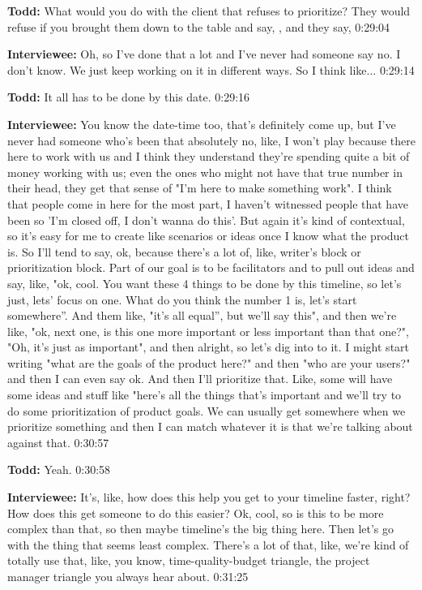 \textbf{Todd:} What would you do with the client that refuses to prioritize?  They would refuse if you brought them down to the table and say, , and they say,    0:29:04

\textbf{Interviewee:} Oh, so I've done that a lot and I've never had someone say no.  I don't know.  We just keep working on it in different ways.  So I think like...   0:29:14

\textbf{Todd:} It all has to be done by this date.   0:29:16

\textbf{Interviewee:} You know the date-time too, that's definitely come up, but I've never had someone who's been that absolutely no, like, I won't play because there here to work with us and I think they understand they're spending quite a bit of money working with us; even the ones who might not have that true number in their head, they get that sense of "I'm here to make something work". I think that people come in here for the most part, I haven't witnessed people that have been so 'I'm closed off, I don't wanna do this'.  But again it's kind of contextual, so it's easy for me to create like scenarios or ideas once I know what the product is.  So I'll tend to say, ok, because there's a lot of, like, writer's block or prioritization block.  Part of our goal is to be facilitators and to pull out ideas and say, like, "ok, cool.  You want these 4 things to be done by this timeline, so let's just, lets' focus on one.  What do you think the number 1 is, let's start somewhere”.  And them like, "it's all equal”, but we'll say this", and then we're like, "ok, next one, is this one more important or less important than that one?", "Oh, it's just as important", and then alright, so let's dig into to it.   I might start writing "what are the goals of the product here?" and then "who are your users?" and then I can even say ok.  And then I'll prioritize that.  Like, some will have some ideas and stuff like "here's all the things that's important and we'll try to do some prioritization of product goals. We can usually get somewhere when we prioritize something and then I can match whatever it is that we're talking about against that.   0:30:57

\textbf{Todd:} Yeah.   0:30:58

\textbf{Interviewee:} It's, like, how does this help you get to your timeline faster, right? How does this get someone to do this easier?  Ok, cool, so is this to be more complex than that, so then maybe timeline's the big thing here.  Then let's go with the thing that seems least complex.  There's a lot of that, like, we're kind of totally use that, like, you know, time-quality-budget triangle, the project manager triangle you always hear about.   0:31:25

